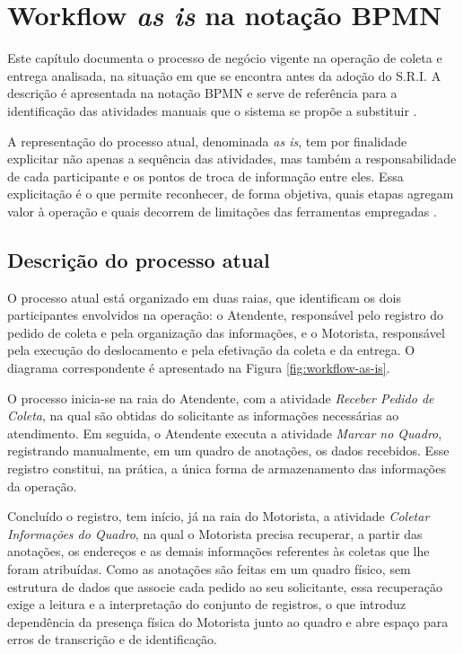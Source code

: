 \chapter{Workflow \textit{as is} na notação BPMN}\label{cap:workflow-bpmn}

Este capítulo documenta o processo de negócio vigente na operação de coleta e entrega analisada, na situação em que se encontra antes da adoção do S.R.I. A descrição é apresentada na notação BPMN e serve de referência para a identificação das atividades manuais que o sistema se propõe a substituir \cite{omg2011bpmn}.

A representação do processo atual, denominada \textit{as is}, tem por finalidade explicitar não apenas a sequência das atividades, mas também a responsabilidade de cada participante e os pontos de troca de informação entre eles. Essa explicitação é o que permite reconhecer, de forma objetiva, quais etapas agregam valor à operação e quais decorrem de limitações das ferramentas empregadas \cite{omg2011bpmn}.

\section{Descrição do processo atual}

O processo atual está organizado em duas raias, que identificam os dois participantes envolvidos na operação: o Atendente, responsável pelo registro do pedido de coleta e pela organização das informações, e o Motorista, responsável pela execução do deslocamento e pela efetivação da coleta e da entrega. O diagrama correspondente é apresentado na Figura \ref{fig:workflow-as-is}.

O processo inicia-se na raia do Atendente, com a atividade \textit{Receber Pedido de Coleta}, na qual são obtidas do solicitante as informações necessárias ao atendimento. Em seguida, o Atendente executa a atividade \textit{Marcar no Quadro}, registrando manualmente, em um quadro de anotações, os dados recebidos. Esse registro constitui, na prática, a única forma de armazenamento das informações da operação.

Concluído o registro, tem início, já na raia do Motorista, a atividade \textit{Coletar Informações do Quadro}, na qual o Motorista precisa recuperar, a partir das anotações, os endereços e as demais informações referentes às coletas que lhe foram atribuídas. Como as anotações são feitas em um quadro físico, sem estrutura de dados que associe cada pedido ao seu solicitante, essa recuperação exige a leitura e a interpretação do conjunto de registros, o que introduz dependência da presença física do Motorista junto ao quadro e abre espaço para erros de transcrição e de identificação.

